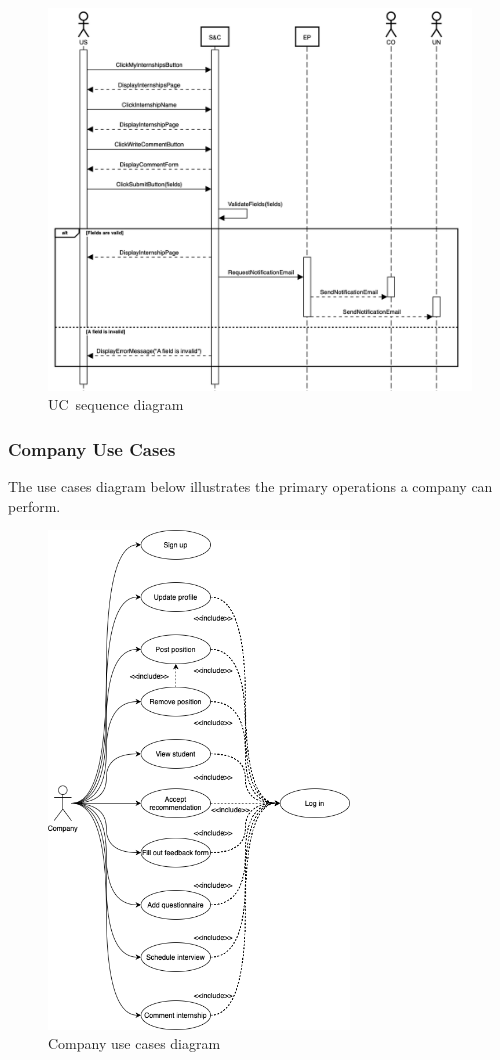 \begin{figure}
    \centering
    \includegraphics[width=16cm]{images/sequence-diagrams/student-comments-internship.png}
    \caption{UC\theuc\ sequence diagram}
\end{figure}


\clearpage
\subsubsection{Company Use Cases}
The use cases diagram below illustrates the primary operations a company can perform.

\begin{figure}[h]
    \centering
    \includegraphics[width=8cm]{images/use-cases-diagrams/company.png}
    \caption{Company use cases diagram}
\end{figure}

